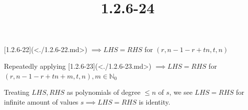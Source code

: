 \documentclass{article}
\title{1.2.6-24}
\begin{document}
\maketitle

[1.2.6-22](<./1.2.6-22.md>) $\implies LHS = RHS$ for $(r,n-1-r+tn,t,n)$

Repeatedly applying [1.2.6-23](<./1.2.6-23.md>) $\implies LHS = RHS$ for $(r,n-1-r+tn + m,t,n), m \in \mathbb{N}_0$

Treating $LHS, RHS$ as polynomials of degree $\leq n$ of $s$, we see $LHS = RHS$ for infinite amount of values $s \implies LHS = RHS$ is identity.
\end{document}
